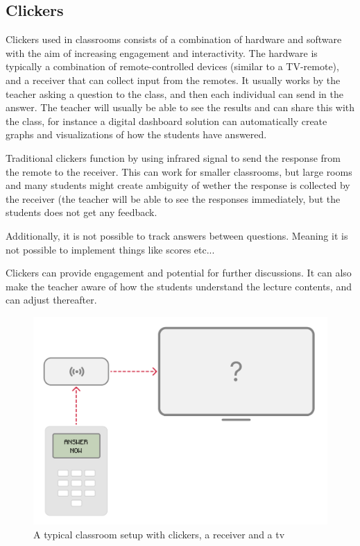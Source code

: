 \subsection{Clickers}
Clickers used in classrooms consists of a combination of hardware and software with the aim of increasing engagement and interactivity. The hardware is typically a combination of remote-controlled devices (similar to a TV-remote), and a receiver that can collect input from the remotes. It usually works by the teacher asking a question to the class, and then each individual can send in the answer. The teacher will usually be able to see the results and can share this with the class, for instance a digital dashboard solution can automatically create graphs and visualizations of how the students have answered. 

Traditional clickers function by using infrared signal to send the response from the remote to the receiver. This can work for smaller classrooms, but large rooms and many students might create ambiguity of wether the response is collected by the receiver (the teacher will be able to see the responses immediately, but the students does not get any feedback. 

Additionally, it is not possible to track answers between questions. Meaning it is not possible to implement things like scores etc...

Clickers can provide engagement and potential for further discussions. It can also make the teacher aware of how the students understand the lecture contents, and can adjust thereafter. 
\begin{figure}[h!]
    \centering
    \includegraphics[width=1\linewidth]{figures/clickers-illustration.png}
    \caption{A typical classroom setup with clickers, a receiver and a tv}
    \label{fig:A typical classroom setup with clickers, a receiver and a tv}
\end{figure}


